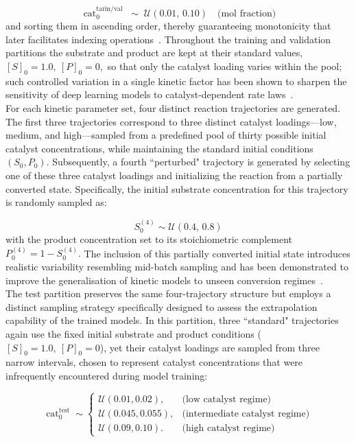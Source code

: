 \documentclass{dissertation}
\begin{document}
\begin{equation}
\operatorname{cat}_0^{\text{tarin/val}} \;\sim\; \mathcal{U}(0.01,\,0.10)\quad\text{(mol fraction)}
\end{equation}
and sorting them in ascending order, thereby guaranteeing monotonicity that later facilitates indexing operations~\cite{Brown2017}.  Throughout the training and validation partitions the substrate and product are kept at their standard values,
\(
[S]_0 = 1.0,\ [P]_0 = 0,
\)
so that only the catalyst loading varies within the pool; such controlled variation in a single kinetic factor has been shown to sharpen the sensitivity of deep learning models to catalyst‐dependent rate laws~\cite{Esterby2020,Olsson2019}.\\

For each kinetic parameter set, four distinct reaction trajectories are generated. The first three trajectories correspond to three distinct catalyst loadings—low, medium, and high—sampled from a predefined pool of thirty possible initial catalyst concentrations, while maintaining the standard initial conditions $(S_0,P_0)$. Subsequently, a fourth ``perturbed" trajectory is  generated by selecting one of these three catalyst loadings and initializing the reaction from a partially converted state. Specifically, the initial substrate concentration for this trajectory is randomly sampled as:


\begin{equation}
S_0^{(4)}\sim \mathcal{U}(0.4,\,0.8)
\end{equation}
with the product concentration set to its stoichiometric complement
\(
P_0^{(4)} = 1 - S_0^{(4)}.
\)
The inclusion of this partially converted initial state introduces realistic variability resembling mid-batch sampling and has been demonstrated to improve the generalisation of kinetic models to unseen conversion regimes~\cite{Rothenberg2024,Guo2024}.\\ 

The test partition preserves the same four-trajectory structure but employs a distinct sampling strategy specifically designed to assess the extrapolation capability of the trained models. In this partition, three ``standard" trajectories again use the fixed initial substrate and product conditions ($[S]_0=1.0,\ [P]_0=0$), yet their catalyst loadings are sampled from three narrow intervals, chosen to represent catalyst concentrations that were infrequently encountered during model training:

\begin{equation}
\operatorname{cat}_0^{\text{test}} \sim
\begin{cases}
\mathcal{U}(0.01, 0.02), & \text{(low catalyst regime)} \\[4pt]
\mathcal{U}(0.045, 0.055), & \text{(intermediate catalyst regime)} \\[4pt]
\mathcal{U}(0.09, 0.10). & \text{(high catalyst regime)}
\end{cases}
\end{equation}
\end{document}
